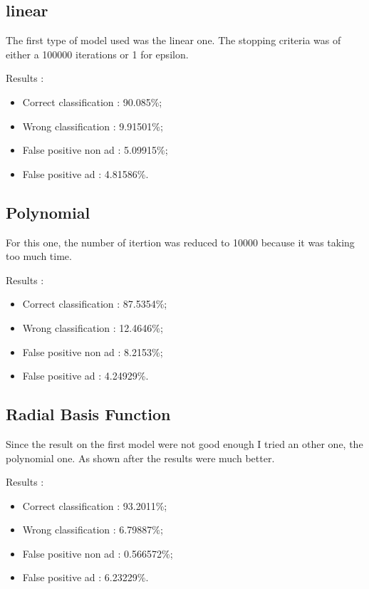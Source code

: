 \subsection{linear}

The first type of model used was the linear one. The stopping criteria was of either a 100000 iterations or 1 for epsilon.

Results :
\begin{itemize}
  \item Correct classification : 90.085\%;
  \item Wrong classification : 9.91501\%;
  \item False positive non ad : 5.09915\%;
  \item False positive ad : 4.81586\%.
\end{itemize}


\subsection{Polynomial}

For this one, the number of itertion was reduced to 10000 because it was taking too much time.

Results :
\begin{itemize}
  \item Correct classification : 87.5354\%;
  \item Wrong classification : 12.4646\%;
  \item False positive non ad : 8.2153\%;
  \item False positive ad : 4.24929\%.
\end{itemize}

\subsection{Radial Basis Function}

Since the result on the first model were not good enough I tried an other one, the polynomial one. As shown after the results were much better.

Results :
\begin{itemize}
  \item Correct classification : 93.2011\%;
  \item Wrong classification : 6.79887\%;
  \item False positive non ad : 0.566572\%;
  \item False positive ad : 6.23229\%.
\end{itemize}

